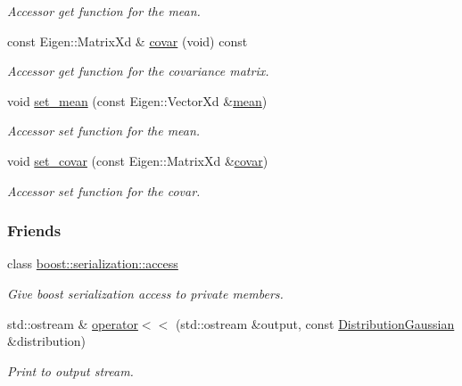 \begin{DoxyCompactItemize}
\begin{DoxyCompactList}\small\item\em Accessor get function for the mean. \end{DoxyCompactList}\item 
const Eigen\+::\+Matrix\+Xd \& \hyperlink{classDmpBbo_1_1DistributionGaussian_a5d2adde253815df42d471a876173868c}{covar} (void) const 
\begin{DoxyCompactList}\small\item\em Accessor get function for the covariance matrix. \end{DoxyCompactList}\item 
void \hyperlink{classDmpBbo_1_1DistributionGaussian_ac9783c093d50c99c387c241b3bc8729d}{set\+\_\+mean} (const Eigen\+::\+Vector\+Xd \&\hyperlink{classDmpBbo_1_1DistributionGaussian_a612f996501aac7e31237a21b47d03d72}{mean})
\begin{DoxyCompactList}\small\item\em Accessor set function for the mean. \end{DoxyCompactList}\item 
void \hyperlink{classDmpBbo_1_1DistributionGaussian_aecae0b0d3ae1d8c47dc4b13d1b24d169}{set\+\_\+covar} (const Eigen\+::\+Matrix\+Xd \&\hyperlink{classDmpBbo_1_1DistributionGaussian_a5d2adde253815df42d471a876173868c}{covar})
\begin{DoxyCompactList}\small\item\em Accessor set function for the covar. \end{DoxyCompactList}\end{DoxyCompactItemize}
\subsubsection*{Friends}
\begin{DoxyCompactItemize}
\item 
class \hyperlink{classDmpBbo_1_1DistributionGaussian_ac98d07dd8f7b70e16ccb9a01abf56b9c}{boost\+::serialization\+::access}
\begin{DoxyCompactList}\small\item\em Give boost serialization access to private members. \end{DoxyCompactList}\item 
std\+::ostream \& \hyperlink{classDmpBbo_1_1DistributionGaussian_a117d84e639d830f86b54aa05ac129c2f}{operator$<$$<$} (std\+::ostream \&output, const \hyperlink{classDmpBbo_1_1DistributionGaussian}{Distribution\+Gaussian} \&distribution)
\begin{DoxyCompactList}\small\item\em Print to output stream. \end{DoxyCompactList}\end{DoxyCompactItemize}


